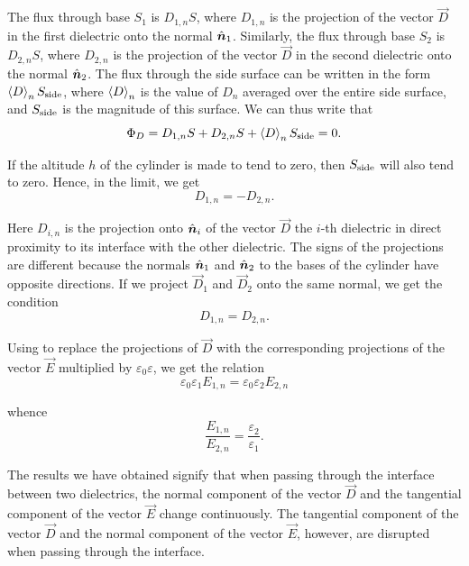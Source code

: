The flux through base $S_1$ is $D_{1,n}S$, where $D_{1,n}$ is the projection of the vector $\vec{D}$ in the first dielectric onto the normal $\hat{\boldsymbol{n}}_1$. Similarly, the flux through base $S_2$ is $D_{2,n}S$, where $D_{2,n}$ is the projection of the vector $\vec{D}$ in the second dielectric onto the normal $\hat{\boldsymbol{n}}_2$. The flux through
the side surface can be written in the form $\left\langle D \right\rangle_nS_{\text{side}}$, where $\left\langle D \right\rangle_n$ is the value of $D_n$ averaged over the entire side surface, and $S_{\text{side}}$ is the magnitude of this surface. We can thus write that
\begin{equation}\label{eq:2_46}
    \Phi_D = D_{1,n} S + D_{2,n} S + \left\langle D \right\rangle_nS_{\text{side}} = 0.
\end{equation}

\noindent
If the altitude $h$ of the cylinder is made to tend to zero, then $S_{\text{side}}$ will also tend to zero. Hence, in the limit, we get
\begin{equation*}
    D_{1,n} = - D_{2,n}.
\end{equation*}

\noindent
Here $D_{i,n}$ is the projection onto $\hat{\boldsymbol{n}}_i$ of the vector $\vec{D}$ the $i$-th dielectric in direct proximity to its interface with the other dielectric. The signs of the projections are different because the normals $\hat{\boldsymbol{n}}_1$ and $\hat{\boldsymbol{n}}_2$ to the bases of the cylinder have opposite directions. If we project $\vec{D}_1$ and $\vec{D}_2$ onto the same normal, we get the condition
\begin{equation}\label{eq:2_47}
    D_{1,n} = D_{2,n}.
\end{equation}

Using  to replace the projections of $\vec{D}$ with the corresponding projections of the vector $\vec{E}$ multiplied by $\varepsilon_0\varepsilon$, we get the relation
\begin{equation*}
    \varepsilon_0 \varepsilon_1 E_{1,n} = \varepsilon_0 \varepsilon_2 E_{2,n}
\end{equation*}

\noindent
whence
\begin{equation}\label{eq:2_48}
    \frac{E_{1,n}}{E_{2,n}} = \frac{\varepsilon_2}{\varepsilon_1}.
\end{equation}

The results we have obtained signify that when passing through the interface between two dielectrics, the normal component of the vector $\vec{D}$ and the tangential component of the vector $\vec{E}$ change continuously. The tangential component of the vector $\vec{D}$ and the normal
component of the vector $\vec{E}$, however, are disrupted when passing through the interface.

